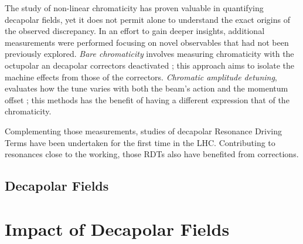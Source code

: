 The study of non-linear chromaticity has proven valuable in quantifying decapolar fields, yet it
does not permit alone to understand the exact origins of the observed discrepancy. In an effort to
gain deeper insights, additional measurements were performed focusing on novel observables that had
not been previously explored.
\textit{Bare chromaticity} involves measuring chromaticity with
the octupolar an decapolar correctors deactivated ; this approach aims to isolate the machine
effects from those of the correctors.
\textit{Chromatic amplitude detuning}, evaluates how the tune varies with both the beam's action and
the momentum offset ; this methods has the benefit of having a different expression that of the
chromaticity.


Complementing those measurements, studies of decapolar Resonance Driving Terms have been undertaken
for the first time in the LHC. Contributing to resonances close to the working, those RDTs also have
benefited from corrections.


\subsection{Decapolar Fields}

















\section{Impact of Decapolar Fields}
